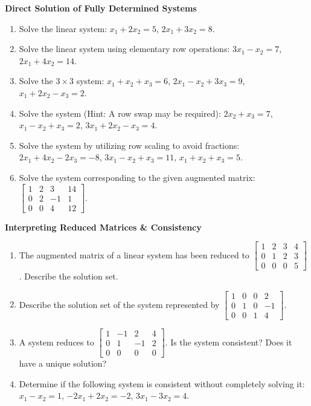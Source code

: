 \documentclass[11pt]{article}
\begin{document}
\textbf{Direct Solution of Fully Determined Systems}
\begin{enumerate}[label=\textbf{1.1.\arabic*}]
    \item Solve the linear system: 
    $x_1 + 2x_2 = 5$, 
    $2x_1 + 3x_2 = 8$.
    \item Solve the linear system using elementary row operations: 
    $3x_1 - x_2 = 7$, 
    $2x_1 + 4x_2 = 14$.
    \item Solve the $3 \times 3$ system:
    $x_1 + x_2 + x_3 = 6$,
    $2x_1 - x_2 + 3x_3 = 9$,
    $x_1 + 2x_2 - x_3 = 2$.
    \item Solve the system (Hint: A row swap may be required):
    $2x_2 + x_3 = 7$,
    $x_1 - x_2 + x_3 = 2$,
    $3x_1 + 2x_2 - x_3 = 4$.
    \item Solve the system by utilizing row scaling to avoid fractions:
    $2x_1 + 4x_2 - 2x_3 = -8$,
    $3x_1 - x_2 + x_3 = 11$,
    $x_1 + x_2 + x_3 = 5$.
    \item Solve the system corresponding to the given augmented matrix:
    $\left[\begin{array}{ccc|c} 1 & 2 & 3 & 14 \\ 0 & 2 & -1 & 1 \\ 0 & 0 & 4 & 12 \end{array}\right]$.
\end{enumerate}

\textbf{Interpreting Reduced Matrices \& Consistency}
\begin{enumerate}[label=\textbf{1.1.\arabic*}, resume]
    \item The augmented matrix of a linear system has been reduced to $\left[\begin{array}{ccc|c} 1 & 2 & 3 & 4 \\ 0 & 1 & 2 & 3 \\ 0 & 0 & 0 & 5 \end{array}\right]$. Describe the solution set.
    \item Describe the solution set of the system represented by $\left[\begin{array}{ccc|c} 1 & 0 & 0 & 2 \\ 0 & 1 & 0 & -1 \\ 0 & 0 & 1 & 4 \end{array}\right]$.
    \item A system reduces to $\left[\begin{array}{ccc|c} 1 & -1 & 2 & 4 \\ 0 & 1 & -1 & 2 \\ 0 & 0 & 0 & 0 \end{array}\right]$. Is the system consistent? Does it have a unique solution?
    \item Determine if the following system is consistent without completely solving it:
    $x_1 - x_2 = 1$, 
    $-2x_1 + 2x_2 = -2$, 
    $3x_1 - 3x_2 = 4$.
\end{enumerate}
\end{document}
